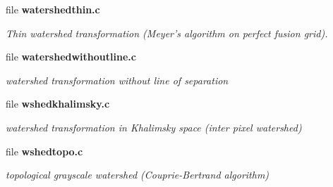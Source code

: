 \begin{CompactItemize}
\item 
file {\bf watershedthin.c}
\begin{CompactList}\small\item\em Thin watershed transformation (Meyer's algorithm on perfect fusion grid). \item\end{CompactList}

\item 
file {\bf watershedwithoutline.c}
\begin{CompactList}\small\item\em watershed transformation without line of separation \item\end{CompactList}

\item 
file {\bf wshedkhalimsky.c}
\begin{CompactList}\small\item\em watershed transformation in Khalimsky space (inter pixel watershed) \item\end{CompactList}

\item 
file {\bf wshedtopo.c}
\begin{CompactList}\small\item\em topological grayscale watershed (Couprie-Bertrand algorithm) \item\end{CompactList}

\end{CompactItemize}
